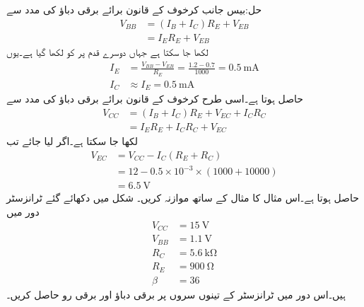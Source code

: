 حل:بیس جانب کرخوف کے قانون برائے برقی دباؤ کی مدد سے 
\begin{align*}
V_{BB}&=\left(I_B+I_C \right) R_E+V_{EB}\\
&=I_E R_E +V_{EB}
\end{align*}
لکھا جا سکتا ہے جہاں دوسرے قدم پر  کو  لکھا گیا ہے۔یوں
\begin{align*}
I_E&=\frac{V_{BB}-V_{EB}}{R_E}=\frac{1.2-0.7}{1000}=\SI{0.5}{\milli \ampere}\\
I_C &\approx I_E =\SI{0.5}{\milli \ampere} 
\end{align*}
حاصل ہوتا ہے۔اسی طرح کرخوف کے قانون برائے برقی دباؤ کی مدد سے
\begin{align*}
V_{CC}&=\left(I_B+I_C \right)R_E+V_{EC}+I_C R_C\\
&=I_E  R_E + I_C R_C +V_{EC}
\end{align*}
لکھا جا سکتا ہے۔اگر  لیا جائے تب
\begin{align*}
V_{EC}&=V_{CC}-I_C \left(R_E+R_C \right)\\
&=12-0.5 \times 10^{-3} \times \left (1000+10000 \right)\\
&=\SI{6.5}{\volt}
\end{align*}
حاصل ہوتا ہے۔اس مثال کا مثال  کے ساتھ موازنہ کریں۔ 
شکل    میں دکھائے گئے ٹرانزسٹر دور میں
\begin{align*}
V_{CC} &=\SI{15}{\volt}\\
V_{BB} &=\SI{1.1}{\volt}\\
R_C&=\SI{5.6}{\kilo \ohm} \\
R_E &=\SI{900}{\ohm} \\
\beta &=36
\end{align*}
 ہیں۔اس دور میں ٹرانزسٹر کے تینوں سروں پر برقی دباؤ اور برقی رو حاصل کریں۔

